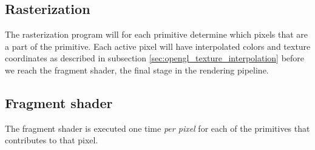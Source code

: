 \subsection{Rasterization}
The rasterization program will for each primitive determine which pixels that are a part of the primitive. Each active pixel will have interpolated colors and texture coordinates as described in subsection \ref{sec:opengl_texture_interpolation} before we reach the fragment shader, the final stage in the rendering pipeline.
\subsection{Fragment shader}
The fragment shader is executed one time \textit{per pixel} for each of the primitives that contributes to that pixel. 